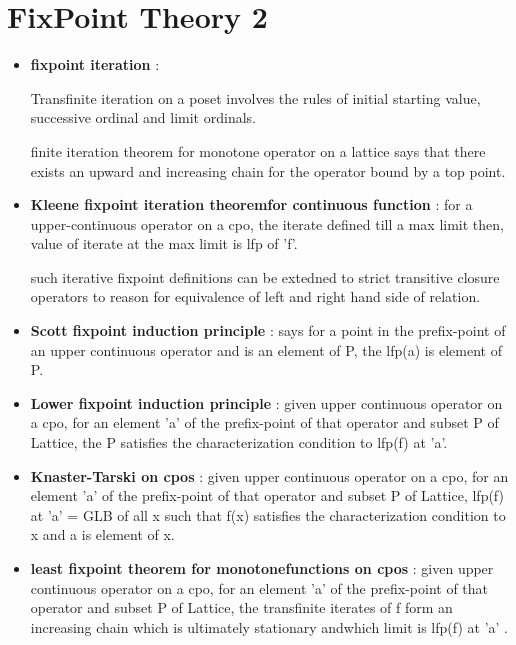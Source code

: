 \chapter{FixPoint Theory 2}

\begin{itemize}
	\item{\textbf{fixpoint iteration} : 

	Transfinite iteration on a poset involves the rules of initial starting value, successive ordinal and limit ordinals.

	finite iteration theorem for monotone operator  on a lattice says that there exists an upward and increasing chain for the operator bound by a top point. 
	}

	\item{\textbf{Kleene fixpoint iteration theoremfor continuous function} : for a upper-continuous operator on a cpo, the iterate defined till a max limit then, value of iterate at the max limit is lfp of 'f'.	

	such iterative fixpoint definitions can be extedned to strict transitive closure operators to reason for equivalence of left and right hand side of relation.
	}

	\item{\textbf{Scott fixpoint induction principle} : says for a point in the prefix-point of an upper continuous operator and is an element of P, the lfp(a) is element of P.

	}

	\item{\textbf{Lower fixpoint induction principle} : given upper continuous operator on a cpo, for an element 'a' of the prefix-point of that operator and subset P of Lattice, the P satisfies the characterization condition to lfp(f) at 'a'.
	}
	
	\item{\textbf{Knaster-Tarski on cpos} : given upper continuous operator on a cpo, for an element 'a' of the prefix-point of that operator and subset P of Lattice,  lfp(f) at 'a'  = GLB of all x such that f(x) satisfies the characterization condition to x and a is element of x.
	}

	\item{\textbf{least fixpoint theorem for monotonefunctions on cpos } : given upper continuous operator on a cpo, for an element 'a' of the prefix-point of that operator and subset P of Lattice, the transfinite iterates of f form an increasing chain which is ultimately stationary andwhich limit is lfp(f) at 'a' .
	}


\end{itemize}
